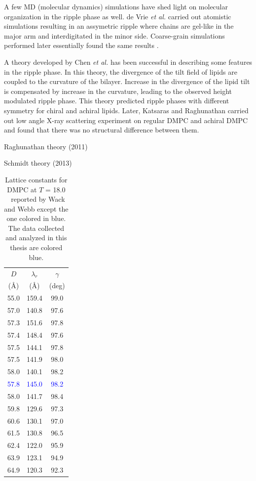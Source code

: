 A few MD (molecular dynamics) simulations have shed light on molecular 
organization in the ripple phase as well. 
de Vrie \textit{et al.} \cite{ref:deVries05}
carried out atomistic simulations resulting in an
assymetric ripple where chains are gel-like in the major arm and
interdigitated in the minor side. Coarse-grain
simulations performed later essentially found the same results
\cite{ref:Lenz07}.

A theory developed by Chen \textit{et al.} \cite{ref:Chen95} has been 
successful in describing some features in the ripple phase. In this theory,
the divergence of the tilt field of lipids are coupled to the curvature 
of the bilayer. Increase in the divergence of the lipid tilt is compensated 
by increase in the curvature, leading to the observed height modulated
ripple phase. This theory predicted ripple phases with different symmetry
for chiral and achiral lipids. Later, Katsaras and Raghunathan 
\cite{ref:Katsaras95} carried out low angle X-ray scattering experiment
on regular DMPC and achiral DMPC and found that there was no structural
difference between them. 

Raghunathan theory (2011)

Schmidt theory (2013)

\begin{table}[htbp]
\centering
  \begin{tabular}{ccc}
    \hline
    $D$ & $\lambda_r$ & $\gamma$ \\
    (\AA) & (\AA) & (deg) \\
    \hline
    55.0 & 159.4 & 99.0 \\
    57.0 & 140.8 & 97.6 \\
    57.3 & 151.6 & 97.8 \\
    57.4 & 148.4 & 97.6 \\
    57.5	 & 144.1 & 97.8 \\
    57.5 & 141.9 & 98.0 \\
    58.0 & 140.1 & 98.2 \\
    \textcolor{blue}{57.8} & \textcolor{blue}{145.0} & \textcolor{blue}{98.2} \\
    58.0 & 141.7 & 98.4 \\
    59.8 & 129.6 & 97.3 \\
    60.6 & 130.1 & 97.0 \\
    61.5 & 130.8 & 96.5 \\
    62.4 & 122.0 & 95.9 \\
    63.9 & 123.1 & 94.9 \\
    64.9 & 120.3 & 92.3 \\    
    \hline 
  \end{tabular}
  \caption{Lattice constants for DMPC at $T$ = 18.0 \textcelsius\
  reported by Wack and Webb \cite{ref:Wack89} except the one colored in blue. 
  The data collected and analyzed in this thesis
  are colored blue.} 
\end{table}

